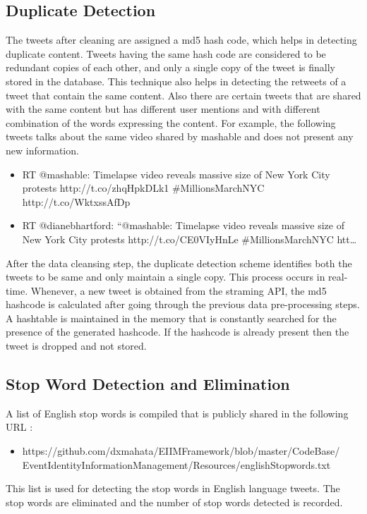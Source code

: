\subsection{Duplicate Detection}
The tweets after cleaning are assigned a md5 hash code, which helps in detecting duplicate content. Tweets having the same hash code are considered to be redundant copies of each other, and only a single copy of the tweet is finally stored in the database. This technique also helps in detecting the retweets of a tweet that contain the same content. Also there are certain tweets that are shared with the same content but has different user mentions and with different combination of the words expressing the content. For example, the following tweets talks about the same video shared by mashable and does not present any new information. 

\begin{itemize}
\item RT @mashable: Timelapse video reveals massive size of New York City protests http://t.co/zhqHpkDLk1 \#MillionsMarchNYC http://t.co/WktxssAfDp
\item RT @dianebhartford: ``@mashable: Timelapse video reveals massive size of New York City protests http://t.co/CE0VIyHnLe \#MillionsMarchNYC htt…
\end{itemize}


After the data cleansing step, the duplicate detection scheme identifies both the tweets to be same and only maintain a single copy. This process occurs in real-time. Whenever, a new tweet is obtained from the straming API, the md5 hashcode is calculated after going through the previous data pre-processing steps. A hashtable is maintained in the memory that is constantly searched for the presence of the generated hashcode. If the hashcode is already present then the tweet is dropped and not stored.

\subsection{Stop Word Detection and Elimination}
A list of English stop words is compiled that is publicly shared in the following URL :  
\begin{itemize}
\item https://github.com/dxmahata/EIIMFramework/blob/master/CodeBase/\\EventIdentityInformationManagement/Resources/englishStopwords.txt
\end{itemize}
This list is used for detecting the stop words in English language tweets. The stop words are eliminated and the number of stop words detected is recorded.

